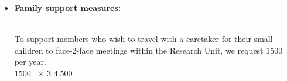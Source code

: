 \documentclass[10pt,fleqn,twoside,a4paper]{article}
\begin{document}
\begin{itemize}
\begin{Emphasize}
{\bf International conference:} An international conference on TDs.
\end{Emphasize}\\
We intend to wrap up the RU with an international small size conference
on the topic (roughly 60 participants). We apply for 30,000~\EUR{} for this.
\vspace{0.2em}\\
30.000~\EUR{} $\times$ 1              \hfill 30.000~\EUR{}\\
\item 
\begin{Emphasize}
{\bf Family support measures:}
\end{Emphasize}\\
To support members who wish to travel with a caretaker for their small children to
face-2-face meetings within the Research Unit, we request 1500~\EUR{} per year.
\vspace{0.2em}\\
1500~\EUR{} $\times$ 3              \hfill 4.500~\EUR{}\\
\end{itemize}
\end{document}
